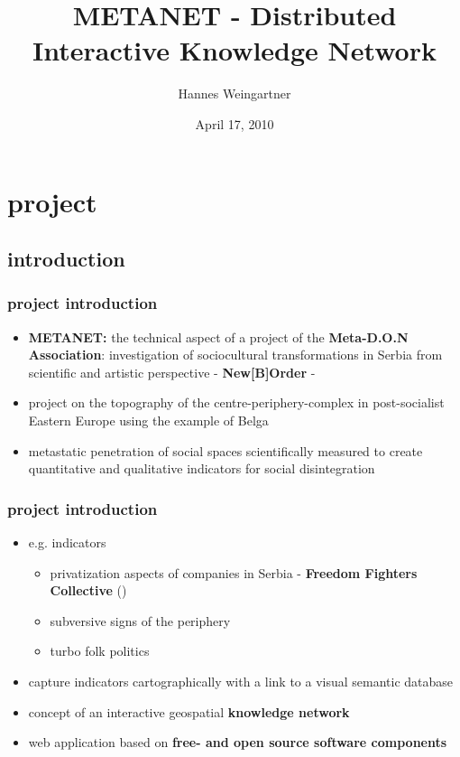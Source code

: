 \documentclass[blue]{beamer}
\title{METANET - Distributed Interactive Knowledge Network}
\institute[META-D.O.N]{META-D.O.N\\Association for Cultural Substitution Services\\Linz / Vienna}
\author{Hannes Weingartner}
\date{April 17, 2010}
\begin{document}
\frame{\titlepage}

\setcounter{tocdepth}{1}
\frame{\tableofcontents}

\hypersetup{linkcolor=white}


\section{project}
\subsection{introduction}
\frame
{
\frametitle{\textbf{project introduction}}
\begin{itemize}
\item \textbf{METANET:} the technical aspect of a project of the \textbf{Meta-D.O.N Association}: investigation of sociocultural transformations in Serbia from scientific and artistic perspective - \textbf{New[B]Order} - 
\item project on the topography of the centre-periphery-complex in post-socialist Eastern Europe using the example of Belga
\item metastatic penetration of social spaces scientifically measured to create quantitative and qualitative indicators for social disintegration
\end{itemize}
}

\frame
{
\frametitle{\textbf{project introduction}}
\begin{itemize}
	\item e.g. indicators
	\begin{itemize}
		\item privatization aspects of companies in Serbia - \textbf{Freedom Fighters Collective} ()
		\item subversive signs of the periphery
		\item turbo folk politics
	\end{itemize}
	\item capture indicators cartographically with a link to a visual semantic database
	\item concept of an interactive geospatial \textbf{knowledge network}
	\item web application based on \textbf{free- and open source software components}
\end{itemize}
}
\end{document}
